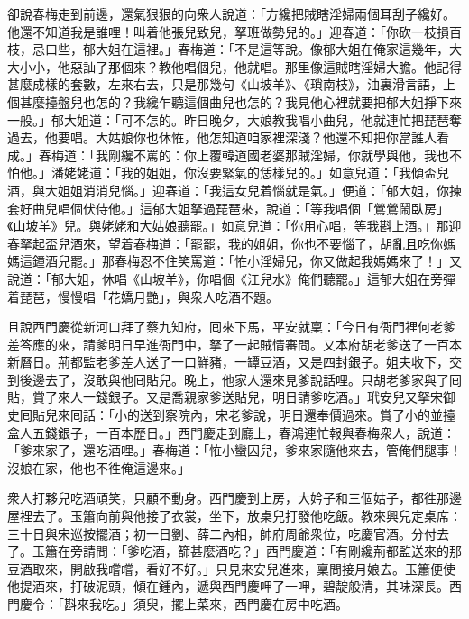 卻說春梅走到前邊，還氣狠狠的向衆人說道：「方纔把賊瞎淫婦兩個耳刮子纔好。他還不知道我是誰哩！叫着他張兒致兒，拏班做勢兒的。」迎春道：「你砍一枝損百枝，{}忌口些，郁大姐在這裡。」春梅道：「不是這等說。像郁大姐在俺家這幾年，大大小小，他惡訕了那個來？教他唱個兒，他就唱。那里像這賊瞎淫婦大膽。他記得甚麼成樣的套數，左來右去，只是那幾句《山坡羊》、《瑣南枝》，油裏滑言語，上個甚麼擡盤兒也怎的？我纔乍聽這個曲兒也怎的？我見他心裡就要把郁大姐掙下來一般。」郁大姐道：「可不怎的。昨日晚夕，大娘教我唱小曲兒，他就連忙把琵琶奪過去，他要唱。大姑娘你也休恠，他怎知道咱家裡深淺？他還不知把你當誰人看成。」春梅道：「我剛纔不罵的：你上覆韓道國老婆那賊淫婦，你就學與他，我也不怕他。」潘姥姥道：「我的姐姐，你沒要緊氣的恁樣兒的。」{}如意兒道：「我傾盃兒酒，與大姐姐消消兒惱。」迎春道：「我這女兒着惱就是氣。」便道：「郁大姐，你揀套好曲兒唱個伏侍他。」這郁大姐拏過琵琶來，說道：「等我唱個「鶯鶯鬧臥房」《山坡羊》兒。與姥姥和大姑娘聽罷。」如意兒道：「你用心唱，等我斟上酒。」那迎春拏起盃兒酒來，望着春梅道：「罷罷，我的姐姐，你也不要惱了，胡亂且吃你媽媽這鐘酒兒罷。」那春梅忍不住笑罵道：「恠小淫婦兒，你又做起我媽媽來了！」{}又說道：「郁大姐，休唱《山坡羊》，你唱個《江兒水》俺們聽罷。」這郁大姐在旁彈着琵琶，慢慢唱「花嬌月艷」，與衆人吃酒不題。

且說西門慶從新河口拜了蔡九知府，囘來下馬，平安就稟：「今日有衙門裡何老爹差答應的來，請爹明日早進衙門中，拏了一起賊情審問。又本府胡老爹送了一百本新曆日。荊都監老爹差人送了一口鮮豬，一罈豆酒，又是四封銀子。姐夫收下，交到後邊去了，沒敢與他囘貼兒。晚上，他家人還來見爹說話哩。只胡老爹家與了囘貼，賞了來人一錢銀子。又是喬親家爹送貼兒，明日請爹吃酒。」玳安兒又拏宋御史囘貼兒來囘話：「小的送到察院內，宋老爹說，明日還奉價過來。賞了小的並擡盒人五錢銀子，一百本歷日。」西門慶走到廳上，春鴻連忙報與春梅衆人，說道：「爹來家了，還吃酒哩。」春梅道：「恠小蠻囚兒，爹來家隨他來去，管俺們腿事！沒娘在家，他也不徃俺這邊來。」

衆人打夥兒吃酒頑笑，只顧不動身。西門慶到上房，大妗子和三個姑子，都徃那邊屋裡去了。玉簫向前與他接了衣裳，坐下，放桌兒打發他吃飯。教來興兒定桌席：三十日與宋巡按擺酒；初一日劉、薛二內相，帥府周爺衆位，吃慶官酒。分付去了。玉簫在旁請問：「爹吃酒，篩甚麼酒吃？」西門慶道：「有剛纔荊都監送來的那豆酒取來，開啟我嚐嚐，看好不好。」只見來安兒進來，稟問接月娘去。玉簫便使他提酒來，打破泥頭，傾在鍾內，遞與西門慶呷了一呷，碧靛般清，其味深長。西門慶令：「斟來我吃。」須臾，擺上菜來，西門慶在房中吃酒。

